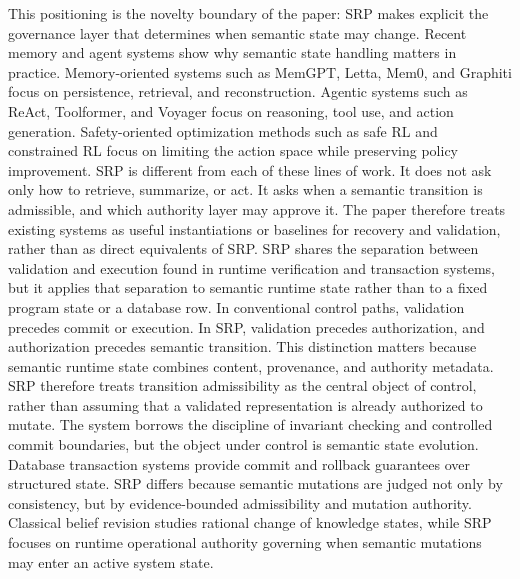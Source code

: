 {}\markdownRendererInterblockSeparator
{}This positioning is the novelty boundary of the paper: SRP makes explicit the governance layer that determines when semantic state may change.\markdownRendererInterblockSeparator
{}
\markdownRendererSectionEnd \markdownRendererSectionBegin
{}\markdownRendererInterblockSeparator
{}Recent memory and agent systems show why semantic state handling matters in practice. Memory-oriented systems such as MemGPT, Letta, Mem0, and Graphiti focus on persistence, retrieval, and reconstruction. Agentic systems such as ReAct, Toolformer, and Voyager focus on reasoning, tool use, and action generation. Safety-oriented optimization methods such as safe RL and constrained RL focus on limiting the action space while preserving policy improvement.\markdownRendererParagraphSeparator
{}SRP is different from each of these lines of work. It does not ask only how to retrieve, summarize, or act. It asks when a semantic transition is admissible, and which authority layer may approve it. The paper therefore treats existing systems as useful instantiations or baselines for recovery and validation, rather than as direct equivalents of SRP.\markdownRendererInterblockSeparator
{}
\markdownRendererSectionEnd \markdownRendererSectionBegin
{}\markdownRendererInterblockSeparator
{}SRP shares the separation between validation and execution found in runtime verification and transaction systems, but it applies that separation to semantic runtime state rather than to a fixed program state or a database row. In conventional control paths, validation precedes commit or execution. In SRP, validation precedes authorization, and authorization precedes semantic transition.\markdownRendererParagraphSeparator
{}This distinction matters because semantic runtime state combines content, provenance, and authority metadata. SRP therefore treats transition admissibility as the central object of control, rather than assuming that a validated representation is already authorized to mutate. The system borrows the discipline of invariant checking and controlled commit boundaries, but the object under control is semantic state evolution.\markdownRendererParagraphSeparator
{}Database transaction systems provide commit and rollback guarantees over structured state. SRP differs because semantic mutations are judged not only by consistency, but by evidence-bounded admissibility and mutation authority. Classical belief revision studies rational change of knowledge states, while SRP focuses on runtime operational authority governing when semantic mutations may enter an active system state.\markdownRendererParagraphSeparator

